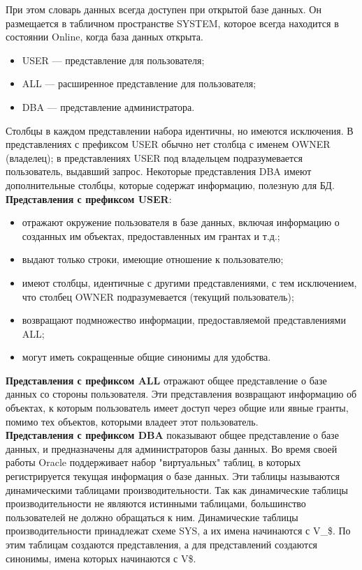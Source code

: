 При этом словарь данных всегда доступен при открытой базе данных. Он размещается в табличном пространстве SYSTEM, которое всегда находится в состоянии Online, когда база данных открыта.

\begin{itemize}
    \item USER — представление для пользователя;
    \item ALL — расширенное представление для пользователя;
    \item DBA — представление администратора.
\end{itemize}

Столбцы в каждом представлении набора идентичны, но имеются исключения. В представлениях с префиксом USER обычно нет столбца с именем OWNER (владелец); в представлениях USER под владельцем подразумевается пользователь, выдавший запрос. Некоторые представления DBA имеют дополнительные столбцы, которые содержат информацию, полезную для БД. ~\\

\textbf{Представления с префиксом USER}:
\begin{itemize}
    \item отражают окружение пользователя в базе данных, включая информацию о созданных им объектах, предоставленных им грантах и т.д.;
    \item выдают только строки, имеющие отношение к пользователю;
    \item имеют столбцы, идентичные с другими представлениями, с тем исключением, что столбец OWNER подразумевается (текущий пользователь);
    \item возвращают подмножество информации, предоставляемой представлениями ALL;
    \item могут иметь сокращенные общие синонимы для удобства.
\end{itemize}

\textbf{Представления с префиксом ALL} отражают общее представление о базе данных со стороны пользователя. Эти представления возвращают информацию об объектах, к которым пользователь имеет доступ через общие или явные гранты, помимо тех объектов, которыми владеет этот пользователь. ~\\

\textbf{Представления с префиксом DBA} показывают общее представление о базе данных, и предназначены для администраторов базы данных. Во время своей работы Oracle поддерживает набор "виртуальных" таблиц, в которых регистрируется текущая информация о базе данных. Эти таблицы называются динамическими таблицами производительности. Так как динамические таблицы производительности не являются истинными таблицами, большинство пользователей не должно обращаться к ним. Динамические таблицы производительности принадлежат схеме SYS, а их имена начинаются с V\_\$. По этим таблицам создаются представления, а для представлений создаются синонимы, имена которых начинаются с V\$.

